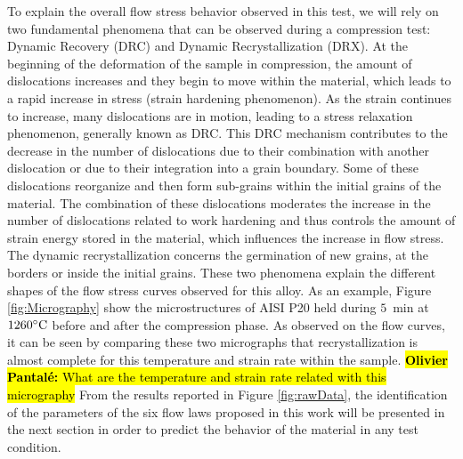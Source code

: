 \documentclass[twoside,english,1p,final,sort&compress]{elsarticle}
\theoremstyle{plain}
\DeclareRobustCommand{\OP}[1]{ {\begingroup\sethlcolor{VWyellow}\textcolor{red}{\hl{\textbf{Olivier Pantal\'e:} #1}}\endgroup} }
\begin{document}
To explain the overall flow stress behavior observed in this test, we will rely on two fundamental phenomena that can be observed during a compression test: Dynamic Recovery (DRC) and Dynamic Recrystallization (DRX).
At the beginning of the deformation of the sample in compression, the amount of dislocations increases and they begin to move within the material, which leads to a rapid increase in stress (strain hardening phenomenon).
As the strain continues to increase, many dislocations are in motion, leading to a stress relaxation phenomenon, generally known as DRC.
This DRC mechanism contributes to the decrease in the number of dislocations due to their combination with another dislocation or due to their integration into a grain boundary.
Some of these dislocations reorganize and then form sub-grains within the initial grains of the material.
The combination of these dislocations moderates the increase in the number of dislocations related to work hardening and thus controls the amount of strain energy stored in the material, which influences the increase in flow stress.
The dynamic recrystallization concerns the germination of new grains, at the borders or inside the initial grains.
These two phenomena explain the different shapes of the flow stress curves observed for this alloy.
As an example, Figure \ref{fig:Micrography} show the microstructures of AISI P20 held during $5$~min at $1260\celsius$ before and after the compression phase.
As observed on the flow curves, it can be seen by comparing these two micrographs that recrystallization is almost complete for this temperature and strain rate within the sample.
\OP{What are the temperature and strain rate related with this micrography}
From the results reported in Figure \ref{fig:rawData}, the identification of the parameters of the six flow laws proposed in this work will be presented in the next section in order to predict the behavior of the material in any test condition.
\end{document}
